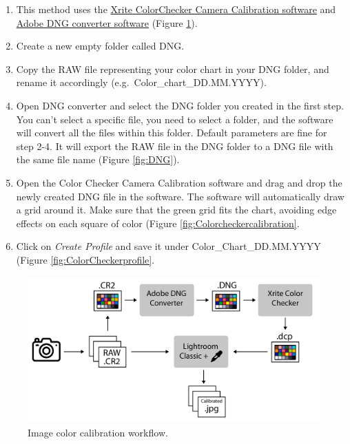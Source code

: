 \documentclass[
]{book}
\begin{document}
\begin{enumerate}
\def\labelenumi{\arabic{enumi}.}
\item
  This method uses the \href{https://xritephoto.com/ph_product_overview.aspx?ID=938\&Action=Support\&SoftwareID=2030}{Xrite ColorChecker Camera Calibration
  software}
  and \href{https://helpx.adobe.com/photoshop/using/adobe-dng-converter.html}{Adobe DNG converter
  software} (Figure \ref{fig:ColorCheckerworkflow}).
\item
  Create a new empty folder called DNG.
\item
  Copy the RAW file representing your color chart in your DNG folder,
  and rename it accordingly (e.g.~Color\_chart\_DD.MM.YYYY).
\item
  Open DNG converter and select the DNG folder you created in the
  first step. You can't select a specific file, you need to select a folder,
  and the software will convert all the files within this folder.
  Default parameters are fine for step 2-4. It will export the RAW file
  in the DNG folder to a DNG file with the same file name (Figure \ref{fig:DNG}).
\item
  Open the Color Checker Camera Calibration software and drag and drop
  the newly created DNG file in the software. The software will
  automatically draw a grid around it. Make sure that the green grid
  fits the chart, avoiding edge effects on each square of color
  (Figure \ref{fig:Colorcheckercalibration}.
\item
  Click on \emph{Create Profile} and save it under Color\_Chart\_DD.MM.YYYY
  (Figure \ref{fig:ColorCheckerprofile}.
\end{enumerate}

\begin{figure}

{\centering \includegraphics[width=0.8\linewidth]{Figures/manual_method} 

}

\caption{Image color calibration workflow.}\label{fig:ColorCheckerworkflow}
\end{figure}
\end{document}

